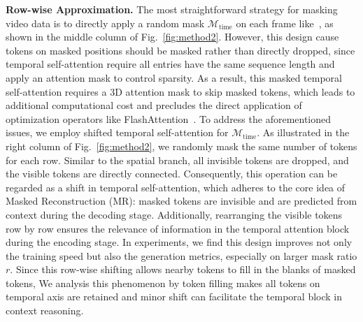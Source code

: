 \noindent\textbf{Row-wise Approximation.} 
The most straightforward strategy for masking video data is to directly apply a random mask $\mathcal{M}_{\text{time}}$ on each frame like~\cite{videomae,videomae_v2}, as shown in the middle column of Fig.~\ref{fig:method2}. However, this design cause tokens on masked positions should be masked rather than directly dropped, since temporal self-attention require all entries have the same sequence length and apply an attention mask to control sparsity.
As a result, this masked temporal self-attention requires a 3D attention mask to skip masked tokens, which leads to additional computational cost and precludes the direct application of optimization operators like FlashAttention~\cite{dao2022flashattention}.
To address the aforementioned issues, we employ shifted temporal self-attention for $\mathcal{M}_{\text{time}}$. As illustrated in the right column of Fig.~\ref{fig:method2}, we randomly mask the same number of tokens for each row. Similar to the spatial branch, all invisible tokens are dropped, and the visible tokens are directly connected. Consequently, this operation can be regarded as a shift in temporal self-attention, which adheres to the core idea of Masked Reconstruction (MR): masked tokens are invisible and are predicted from context during the decoding stage.
Additionally, rearranging the visible tokens row by row ensures the relevance of information in the temporal attention block during the encoding stage. 
In experiments, we find this design improves not only the training speed but also the generation metrics, especially on larger mask ratio $r$. Since this row-wise shifting allows nearby tokens to fill in the blanks of masked tokens, We analysis this phenomenon by token filling makes all tokens on temporal axis are retained and minor shift can facilitate the temporal block in context reasoning.


